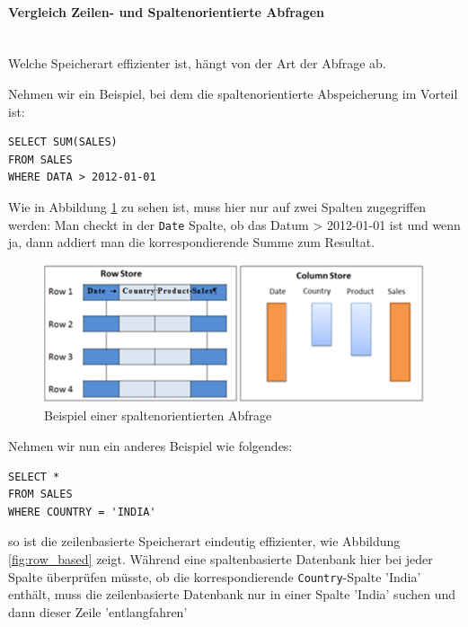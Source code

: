 \documentclass[a4paper, 11pt, nofootinbib]{article}
\newcommand{\code}[1]{\texttt{#1}}
\begin{document}
\paragraph{Vergleich Zeilen- und Spaltenorientierte Abfragen}\mbox{}\\
Welche Speicherart effizienter ist, hängt von der Art der Abfrage ab.

\vspace{10px}

\noindent Nehmen wir ein Beispiel, bei dem die spaltenorientierte Abspeicherung im Vorteil ist: 

\begin{lstlisting}
SELECT SUM(SALES)
FROM SALES
WHERE DATA > 2012-01-01
\end{lstlisting}

Wie in Abbildung \ref{fig:col_based} zu sehen ist, muss hier nur auf zwei Spalten zugegriffen werden: Man checkt in der \code{Date} Spalte, ob das Datum > 2012-01-01 ist und wenn ja, dann addiert man die korrespondierende Summe zum Resultat.

\begin{figure}[htb]
	\centering
	\includegraphics[keepaspectratio=true,height=10\baselineskip]{column_based.jpg}
	\caption{Beispiel einer spaltenorientierten Abfrage}
	\label{fig:col_based}
\end{figure}

\noindent Nehmen wir nun ein anderes Beispiel wie folgendes:

\begin{lstlisting}
SELECT *
FROM SALES
WHERE COUNTRY = 'INDIA'
\end{lstlisting}

\noindent so ist die zeilenbasierte Speicherart eindeutig effizienter, wie Abbildung \ref{fig:row_based} zeigt. Während eine spaltenbasierte Datenbank hier bei jeder Spalte überprüfen müsste, ob die korrespondierende \code{Country}-Spalte 'India' enthält, muss die zeilenbasierte Datenbank nur in einer Spalte 'India' suchen und dann dieser Zeile 'entlangfahren'
\end{document}
